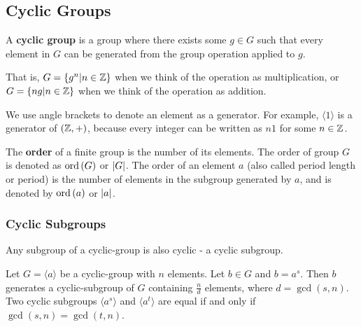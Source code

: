 \documentclass{article}
\begin{document}
\subsection{Cyclic Groups}

\begin{definition}
A \textbf{cyclic group} is a \@{group} where there exists some $g \in G$ such that every element in $G$ can be generated from the group operation applied to $g$.

That is, $G = \left\{ g^n | n \in \mathbb{Z} \right\}$ when we think of the operation as multiplication, or $G = \left\{ ng | n \in \mathbb{Z} \right\}$ when we think of the operation as addition.
\end{definition}

\begin{note}
We use angle brackets to denote an element as a generator. For example, $\langle 1 \rangle$ is a generator of $(\mathbb{Z}, +)$, because every \@{integer} can be written as $n1$ for some $n \in \mathbb{Z}$.
\end{note}

\begin{definition}[order]
The \textbf{order} of a finite \@{group} is the number of its elements. The order of group $G$ is denoted as $\operatorname{ord}{(G)}$ or $\left| G \right|$. The order of an element $a$ (also called period length or period) is the number of elements in the \@{subgroup} generated by $a$, and is denoted by $\operatorname{ord}{(a)}$ or $\left| a \right|$.
\end{definition}

\subsubsection{Cyclic Subgroups}

\begin{definition}
Any \@{subgroup} of a \@{cyclic-group} is also cyclic - a cyclic subgroup.
\end{definition}

\begin{theorem}\label{cyclic-subgroup-generated-by-powers}
Let $G = \langle a \rangle$ be a \@{cyclic-group} with $n$ elements. Let $b \in G$ and $b = a^s$. Then $b$ generates a \@{cyclic-subgroup} of $G$ containing $\frac{n}{d}$ elements, where $d = \gcd(s, n)$. Two cyclic subgroups $\langle a^s \rangle$ and $\langle a^t \rangle$ are equal if and only if $\gcd(s,n) = \gcd(t, n)$.
\end{theorem}
\end{document}
